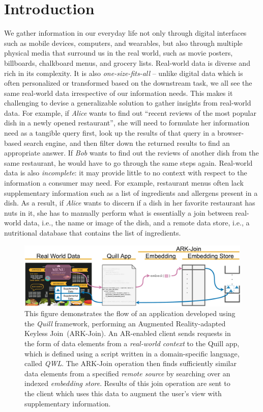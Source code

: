 \documentclass[11pt]{article}
\begin{document}
\section{Introduction}
\label{sec:intro}
We gather information in our everyday life not only through digital interfaces such as mobile devices, computers, and wearables, but also through multiple physical media that surround us in the real world, such as movie posters, billboards, chalkboard menus, and grocery lists. Real-world data is diverse and rich in its complexity. It is also \textit{one-size-fits-all} -- unlike digital data which is often personalized or transformed based on the downstream task, we all see the same real-world data irrespective of our information needs. This makes it challenging to devise a generalizable solution to gather insights from real-world data.
For example, if \textit{Alice} wants to find out ``recent reviews of the most popular dish in a newly opened restaurant'', she will need to formulate her information need as a tangible query first, look up the results of that query in a browser-based search engine, and then filter down the returned results to find an appropriate answer. If \textit{Bob} wants to find out the reviews of another dish from the same restaurant, he would have to go through the same steps again. Real-world data is also \emph{incomplete}: it may provide little to no context with respect to the information a consumer may need. For example, restaurant menus often lack supplementary information such as a list of ingredients and allergens present in a dish. As a result, if \textit{Alice} wants to discern if a dish in her favorite restaurant has nuts in it, she has to manually perform what is essentially a join between real-world data, i.e., the name or image of the dish, and a remote data store, i.e., a nutritional database that contains the list of ingredients.

\begin{figure}
  \centering
  \includegraphics[width=0.94\linewidth]{figs/workflow_large.pdf}
  \caption{This figure demonstrates the flow of an application developed using the \textit{Quill} framework, performing an Augmented Reality-adapted Keyless Join~(ARK-Join). An AR-enabled client sends requests in the form of data elements from a \textit{real-world context} to the Quill app, which is defined using a script written in a domain-specific language, called \textit{QWL}. The ARK-Join operation then finds sufficiently similar data elements from a specified \textit{remote source} by searching over an indexed \textit{embedding store}. Results of this join operation are sent to the client which uses this data to augment the user's view with supplementary information.}
  \label{fig:overview}

\end{figure}
\end{document}
